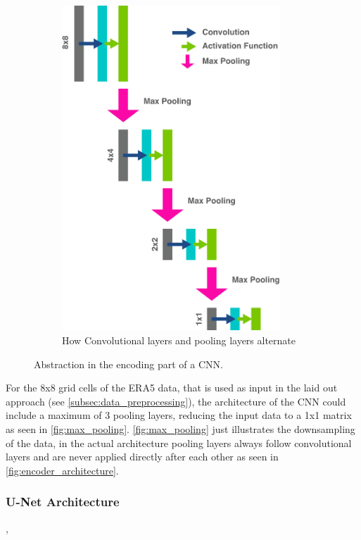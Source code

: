 \begin{figure}
\begin{subfigure}{0.25\textwidth}
        \includegraphics[width=0.9\textwidth]{resources/images/encoder_architecture.png}
        \caption{How Convolutional layers and pooling layers alternate}
        \label{fig:encoder_architecture}
    \end{subfigure}
    \caption{Abstraction in the encoding part of a CNN.}
\end{figure}


For the 8x8 grid cells of the ERA5 data, that is used as input in the laid out approach (see \autoref{subsec:data_preprocessing}), the architecture of the CNN could include a maximum of 3 pooling layers, reducing the input data to a 1x1 matrix as seen in \autoref{fig:max_pooling}. \autoref{fig:max_pooling} just illustrates the downsampling of the data, in the actual architecture pooling layers always follow convolutional layers and are never applied directly after each other as seen in \autoref{fig:encoder_architecture}. 

\subsubsection{U-Net Architecture}
\cite{ronneberger2015}, \cite{liu2018inpaining}

